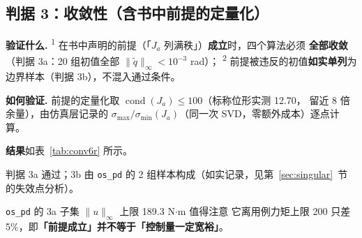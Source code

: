 \documentclass[11pt,a4paper]{ctexart}
\newcommand{\stage}[1]{\textsuperscript{#1}}
\begin{document}
\subsection{判据 3：收敛性（含书中前提的定量化）}

\textbf{验证什么.} \stage{1} 在书中声明的前提（「$J_a$ 列满秩」）\textbf{成立}时，四个算法必须
\textbf{全部收敛}（判据 3a：20 组初值全部 $\|\tilde q\|_\infty<10^{-3}$ rad）；
\stage{2} 前提被违反的初值\textbf{如实单列}为边界样本（判据 3b），不混入通过条件。

\textbf{如何验证.} 前提的定量化取 $\operatorname{cond}(J_a)\le100$（标称位形实测 12.70，
留近 8 倍余量），由仿真层记录的 $\sigma_{\max}/\sigma_{\min}(J_a)$（同一次 SVD，零额外成本）逐点计算。

\textbf{结果}如表~\ref{tab:conv6r} 所示。

\begin{table}[H]
\centering
\small
\caption{6R 上四个算法的收敛性与控制量（判据 3a/3b）}\label{tab:conv6r}
\setlength{\tabcolsep}{4pt}
\end{table}

判据 3a 通过；3b 由 \texttt{os\_pd} 的 2 组样本构成（如实记录，见第~\ref{sec:singular}~节的失效点分析）。

\begin{warnbox}{\texttt{os\_pd} 的 3a 子集 $\|u\|_\infty$ 上限 189.3 N$\cdot$m 值得注意}
它离用例力矩上限 200 只差 5\%，即\textbf{「前提成立」并不等于「控制量一定宽裕」}。
\end{warnbox}
\end{document}
